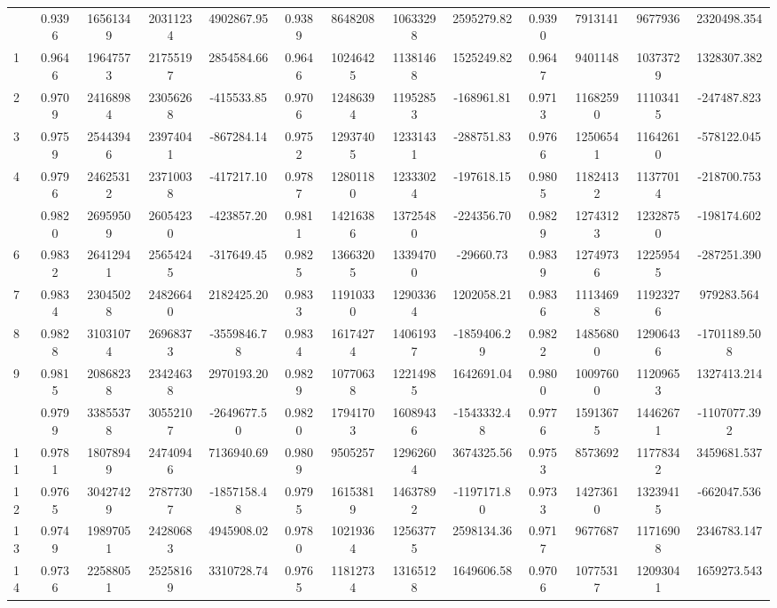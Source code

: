 \documentclass[
  12pt,
]{article}
\begin{document}
\begin{longtable}[t]{lcccccccccccc}
\endfoot
\bottomrule
\endlastfoot
0 & 0.9396 & 16561349 & 20311234 & 4902867.95 & 0.9389 & 8648208 & 10633298 & 2595279.82 & 0.9390 & 7913141 & 9677936 & 2320498.354\\
1 & 0.9646 & 19647573 & 21755197 & 2854584.66 & 0.9646 & 10246425 & 11381468 & 1525249.82 & 0.9647 & 9401148 & 10373729 & 1328307.382\\
2 & 0.9709 & 24168984 & 23056268 & -415533.85 & 0.9706 & 12486394 & 11952853 & -168961.81 & 0.9713 & 11682590 & 11103415 & -247487.823\\
3 & 0.9759 & 25443946 & 23974041 & -867284.14 & 0.9752 & 12937405 & 12331431 & -288751.83 & 0.9766 & 12506541 & 11642610 & -578122.045\\
4 & 0.9796 & 24625312 & 23710038 & -417217.10 & 0.9787 & 12801180 & 12333024 & -197618.15 & 0.9805 & 11824132 & 11377014 & -218700.753\\
\addlinespace
5 & 0.9820 & 26959509 & 26054230 & -423857.20 & 0.9811 & 14216386 & 13725480 & -224356.70 & 0.9829 & 12743123 & 12328750 & -198174.602\\
6 & 0.9832 & 26412941 & 25654245 & -317649.45 & 0.9825 & 13663205 & 13394700 & -29660.73 & 0.9839 & 12749736 & 12259545 & -287251.390\\
7 & 0.9834 & 23045028 & 24826640 & 2182425.20 & 0.9833 & 11910330 & 12903364 & 1202058.21 & 0.9836 & 11134698 & 11923276 & 979283.564\\
8 & 0.9828 & 31031074 & 26968373 & -3559846.78 & 0.9834 & 16174274 & 14061937 & -1859406.29 & 0.9822 & 14856800 & 12906436 & -1701189.508\\
9 & 0.9815 & 20868238 & 23424638 & 2970193.20 & 0.9829 & 10770638 & 12214985 & 1642691.04 & 0.9800 & 10097600 & 11209653 & 1327413.214\\
\addlinespace
10 & 0.9799 & 33855378 & 30552107 & -2649677.50 & 0.9820 & 17941703 & 16089436 & -1543332.48 & 0.9776 & 15913675 & 14462671 & -1107077.392\\
11 & 0.9781 & 18078949 & 24740946 & 7136940.69 & 0.9809 & 9505257 & 12962604 & 3674325.56 & 0.9753 & 8573692 & 11778342 & 3459681.537\\
12 & 0.9765 & 30427429 & 27877307 & -1857158.48 & 0.9795 & 16153819 & 14637892 & -1197171.80 & 0.9733 & 14273610 & 13239415 & -662047.536\\
13 & 0.9749 & 19897051 & 24280683 & 4945908.02 & 0.9780 & 10219364 & 12563775 & 2598134.36 & 0.9717 & 9677687 & 11716908 & 2346783.147\\
14 & 0.9736 & 22588051 & 25258169 & 3310728.74 & 0.9765 & 11812734 & 13165128 & 1649606.58 & 0.9706 & 10775317 & 12093041 & 1659273.543\\

\end{longtable}
\end{document}
